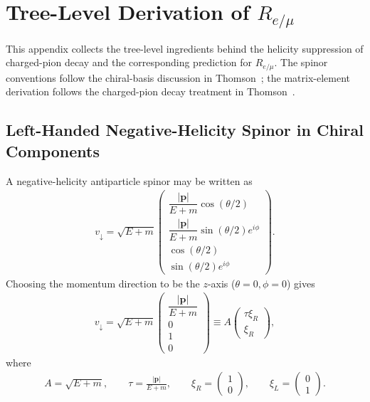 \section{\texorpdfstring{Tree-Level Derivation of $R_{e/\mu}$}{Tree-Level Derivation of Re/mu}}
\label{sec:appendix-tree-level-remu}

This appendix collects the tree-level ingredients behind the helicity
suppression of charged-pion decay and the corresponding prediction for
\(R_{e/\mu}\). The spinor conventions follow the chiral-basis discussion in
Thomson~\cite[Sec.~6.4]{thomson2013modern}; the matrix-element derivation
follows the charged-pion decay treatment in
Thomson~\cite[Sec.~11.6]{thomson2013modern}.

\subsection{Left-Handed Negative-Helicity Spinor in Chiral Components}
\label{subsec:negative-helicity-antiparticle}

A negative-helicity antiparticle spinor may be written as
\begin{align}
v_\downarrow
=
\sqrt{E+m}
\begin{pmatrix}
\dfrac{|\mathbf{p}|}{E+m}\cos(\theta/2) \\
\dfrac{|\mathbf{p}|}{E+m}\sin(\theta/2)e^{i\phi} \\
\cos(\theta/2) \\
\sin(\theta/2)e^{i\phi}
\end{pmatrix}.
\end{align}
Choosing the momentum direction to be the \(z\)-axis (\(\theta = 0, \phi = 0\)) gives
\begin{align}
v_\downarrow
=
\sqrt{E+m}
\begin{pmatrix}
\dfrac{|\mathbf{p}|}{E+m} \\
0 \\
1 \\
0
\end{pmatrix}
\equiv
A
\begin{pmatrix}
\tau \xi_R \\
\xi_R
\end{pmatrix},
\end{align}
where
\begin{align}
A = \sqrt{E+m},
\qquad
\tau = \frac{|\mathbf{p}|}{E+m},
\qquad
\xi_R = \begin{pmatrix}1 \\ 0\end{pmatrix},
\qquad
\xi_L = \begin{pmatrix}0 \\ 1\end{pmatrix}.
\end{align}


